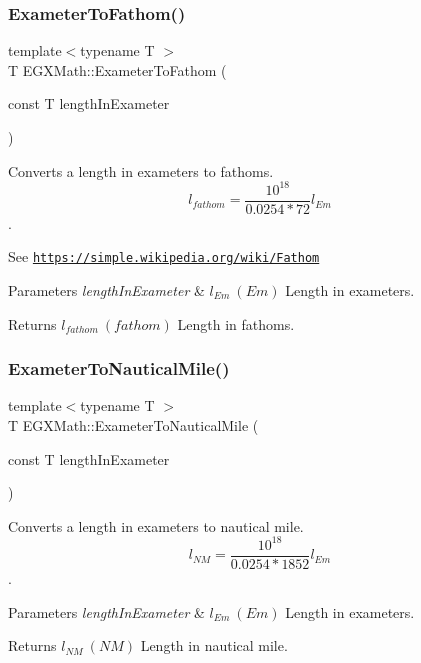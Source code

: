 \subsubsection{\texorpdfstring{Exameter\+To\+Fathom()}{ExameterToFathom()}}
{\footnotesize\ttfamily template$<$typename T $>$ \\
T E\+G\+X\+Math\+::\+Exameter\+To\+Fathom (\begin{DoxyParamCaption}\item[{const T}]{length\+In\+Exameter }\end{DoxyParamCaption})}



Converts a length in exameters to fathoms. \[ l_{fathom}= \frac{10^{18}}{0.0254 * 72} l_{Em} \]. 

See \href{https://simple.wikipedia.org/wiki/Fathom}{\tt https\+://simple.\+wikipedia.\+org/wiki/\+Fathom} 
\begin{DoxyParams}{Parameters}
{\em length\+In\+Exameter} & $ l_{Em}\ (Em)$ Length in exameters. \\
\hline
\end{DoxyParams}
\begin{DoxyReturn}{Returns}
$ l_{fathom}\ (fathom)$ Length in fathoms. 
\end{DoxyReturn}
\mbox{\label{group___e_g_x_math-_conversions-_length_conversions-_exameter-_nautical_gaf593ae9d78bd889caca4e9249be1464a}} 
\subsubsection{\texorpdfstring{Exameter\+To\+Nautical\+Mile()}{ExameterToNauticalMile()}}
{\footnotesize\ttfamily template$<$typename T $>$ \\
T E\+G\+X\+Math\+::\+Exameter\+To\+Nautical\+Mile (\begin{DoxyParamCaption}\item[{const T}]{length\+In\+Exameter }\end{DoxyParamCaption})}



Converts a length in exameters to nautical mile. \[ l_{NM}= \frac{10^{18}}{0.0254 * 1852} l_{Em} \]. 


\begin{DoxyParams}{Parameters}
{\em length\+In\+Exameter} & $ l_{Em}\ (Em)$ Length in exameters. \\
\hline
\end{DoxyParams}
\begin{DoxyReturn}{Returns}
$ l_{NM}\ (NM)$ Length in nautical mile. 
\end{DoxyReturn}
